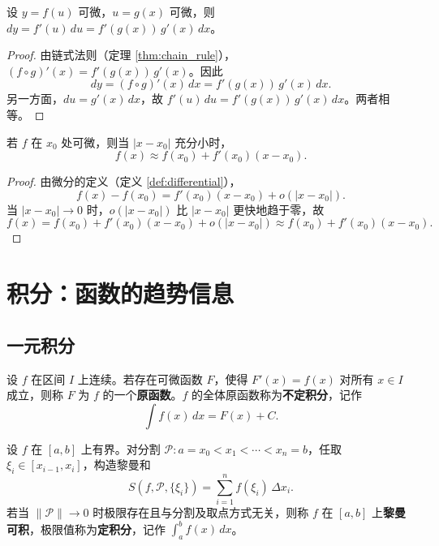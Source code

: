 \begin{theorem}[一阶微分形式不变性]\label{thm:invariance_differential}
设 $y = f(u)$ 可微，$u = g(x)$ 可微，则 $dy = f'(u)\,du = f'(g(x))\,g'(x)\,dx$。
\end{theorem}

\begin{proof}
由链式法则（定理 \ref{thm:chain_rule}），$(f \circ g)'(x) = f'(g(x))\,g'(x)$。因此
\[
dy = (f \circ g)'(x)\,dx = f'(g(x))\,g'(x)\,dx.
\]
另一方面，$du = g'(x)\,dx$，故 $f'(u)\,du = f'(g(x))\,g'(x)\,dx$。两者相等。
\end{proof}

\begin{corollary}[微分的线性逼近性质]\label{cor:linear_approximation}
若 $f$ 在 $x_0$ 处可微，则当 $|x - x_0|$ 充分小时，
\[f(x) \approx f(x_0) + f'(x_0)(x - x_0).\]
\end{corollary}

\begin{proof}
由微分的定义（定义 \ref{def:differential}），
\[
f(x) - f(x_0) = f'(x_0)(x - x_0) + o(|x - x_0|).
\]
当 $|x - x_0| \to 0$ 时，$o(|x-x_0|)$ 比 $|x-x_0|$ 更快地趋于零，故
\[
f(x) = f(x_0) + f'(x_0)(x - x_0) + o(|x - x_0|) \approx f(x_0) + f'(x_0)(x - x_0).
\]
\end{proof}

\section{\texorpdfstring{积分：函数的趋势信息}{积分：函数的趋势信息}}

\subsection{\texorpdfstring{一元积分}{一元积分}}

\begin{definition}[不定积分作为方向的逆运算]\label{def:indefinite_integral}
设 $f$ 在区间 $I$ 上连续。若存在可微函数 $F$，使得 $F'(x) = f(x)$ 对所有 $x \in I$ 成立，则称 $F$ 为 $f$ 的一个\textbf{原函数}。$f$ 的全体原函数称为\textbf{不定积分}，记作
\[\int f(x)\,dx = F(x) + C.\]
\end{definition}

\begin{definition}[黎曼积分]\label{def:riemann_integral}
设 $f$ 在 $[a,b]$ 上有界。对分割 $\mathcal{P}: a = x_0 < x_1 < \cdots < x_n = b$，任取 $\xi_i \in [x_{i-1}, x_i]$，构造黎曼和
\[S(f, \mathcal{P}, \{\xi_i\}) = \sum_{i=1}^{n} f(\xi_i)\,\Delta x_i.\]
若当 $\|\mathcal{P}\| \to 0$ 时极限存在且与分割及取点方式无关，则称 $f$ 在 $[a,b]$ 上\textbf{黎曼可积}，极限值称为\textbf{定积分}，记作 $\int_a^b f(x)\,dx$。
\end{definition}

